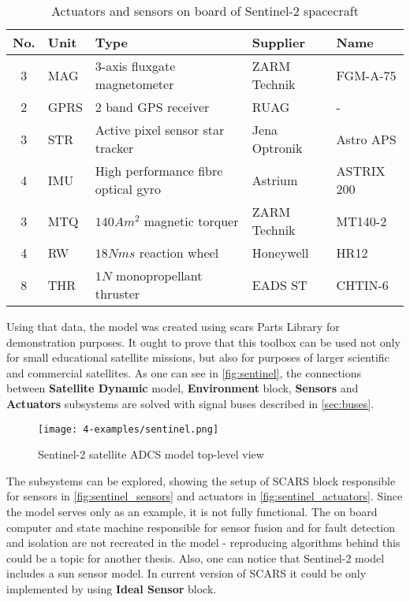         \begin{table}    
            \small
            \begin{tabularx}{\textwidth}{ c l X l l }
                \textbf{No.} & \textbf{Uni}t & \textbf{Type} & \textbf{Supplier} & \textbf{Name} \\ \hline
                3 & MAG & 3-axis fluxgate magnetometer & ZARM Technik & FGM-A-75 \\
                2 & GPRS & 2 band GPS receiver & RUAG & - \\
                3 & STR  & Active pixel sensor star tracker & Jena Optronik & Astro APS \\
                4 & IMU & High performance fibre optical gyro & Astrium & ASTRIX 200 \\
                3 & MTQ & $140 Am^2$ magnetic torquer & ZARM Technik & MT140-2\\
                4 & RW & $18 Nms$ reaction wheel & Honeywell & HR12 \\
                8 & THR & $1N$ monopropellant thruster & EADS ST &CHTIN-6 \\ \hline
            \end{tabularx}
            \caption{Actuators and sensors on board of Sentinel-2 spacecraft\cite{wiedermann2014sentinel}}\label{table:sentinel-adcs}
        \end{table}

        Using that data, the model was created using \ac{scars} Parts Library for demonstration purposes. It ought to prove that this toolbox can be used not only for small educational satellite missions, but also for purposes of larger scientific and commercial satellites. As one can see in \autoref{fig:sentinel}, the connections between \textbf{Satellite Dynamic} model, \textbf{Environment} block, \textbf{Sensors} and \textbf{Actuators} subsystems are solved with signal buses described in \autoref{sec:buses}.
        
        \begin{sidewaysfigure}
            \centering
            \texttt{[image: 4-examples/sentinel.png]}
            \caption{Sentinel-2 satellite ADCS model top-level view}
            \label{fig:sentinel}
        \end{sidewaysfigure}

        The subsystems can be explored, showing the setup of SCARS block responsible for sensors in \autoref{fig:sentinel_sensors} and actuators in \autoref{fig:sentinel_actuators}. Since the model serves only as an example, it is not fully functional. The on board computer and state machine responsible for sensor fusion and for fault detection and isolation are not recreated in the model - reproducing algorithms behind this could be a topic for another thesis. Also, one can notice that Sentinel-2 model includes a sun sensor model. In current version of SCARS it could be only implemented by using \textbf{Ideal Sensor} block.
        
